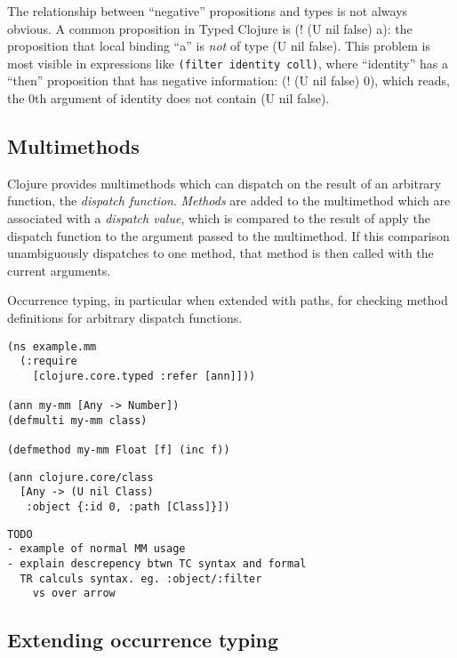 \documentclass[preprint,10pt]{sigplanconf}
\begin{document}
The relationship between ``negative'' propositions and types is not always obvious.
A common proposition in Typed Clojure is (! (U nil false) a): the proposition that
local binding ``a'' is \emph{not} of type (U nil false).
This problem is most visible in expressions like {\tt (filter identity coll)}, where
``identity'' has a ``then'' proposition that has negative information: (! (U nil false) 0),
which reads, the 0th argument of identity does not contain (U nil false).

\subsection{Multimethods}

Clojure provides multimethods which can dispatch on the result of an
arbitrary function, the \emph{dispatch function}. \emph{Methods} are
added to the multimethod
which are associated with a \emph{dispatch value}, which is compared to the
result of apply the dispatch function to the argument passed to the
multimethod. If this comparison unambiguously dispatches to one method,
that method is then called with the current arguments.

Occurrence typing, in particular when extended with paths,
for checking method definitions for arbitrary dispatch functions.

\begin{lstlisting}
(ns example.mm
  (:require 
    [clojure.core.typed :refer [ann]]))

(ann my-mm [Any -> Number])
(defmulti my-mm class)

(defmethod my-mm Float [f] (inc f))
\end{lstlisting}

\begin{lstlisting}
(ann clojure.core/class
  [Any -> (U nil Class)
   :object {:id 0, :path [Class]}])
\end{lstlisting}

\begin{verbatim}
TODO
- example of normal MM usage
- explain descrepency btwn TC syntax and formal
  TR calculs syntax. eg. :object/:filter 
    vs over arrow
\end{verbatim}

\subsection{Extending occurrence typing}
\end{document}

